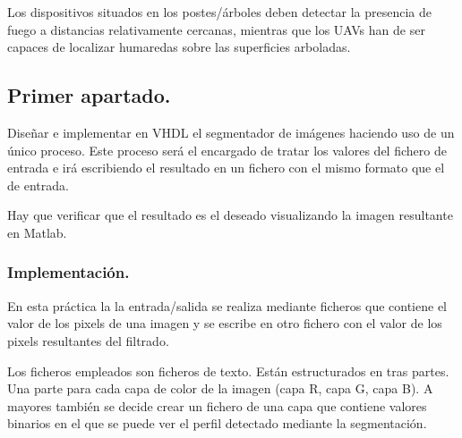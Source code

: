 \documentclass{article}
\begin{document}
	Los dispositivos situados en los postes/árboles deben detectar la presencia de fuego a distancias relativamente cercanas, mientras que los UAVs han de ser capaces de localizar humaredas sobre las superficies arboladas.

\subsection{Primer apartado.}

	Diseñar e implementar en VHDL el segmentador de imágenes haciendo uso de un único proceso. Este proceso será el encargado de tratar los valores del fichero de entrada e irá escribiendo el resultado en un fichero con el mismo formato que el de entrada.
	
	Hay que verificar que el resultado es el deseado  visualizando la imagen resultante en Matlab.

\subsubsection{Implementación.}
	En esta práctica la la entrada/salida se realiza mediante ficheros que contiene el valor de los pixels de una imagen y se escribe en otro fichero con el valor de los pixels resultantes del filtrado.

	Los ficheros empleados son ficheros de texto. Están estructurados en tras partes. Una parte para cada capa de color de la imagen (capa R, capa G, capa B). A mayores también se decide crear un fichero de una capa que contiene valores binarios en el que se puede ver el perfil detectado mediante la segmentación.
	
\end{document}
